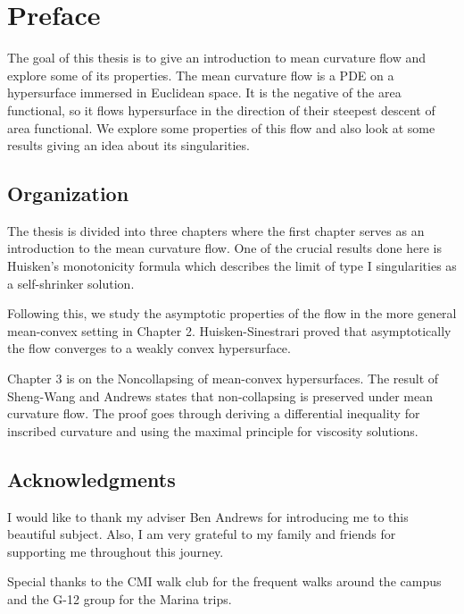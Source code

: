 \chapter{Preface}

The goal of this thesis is to give an introduction to mean curvature flow and explore some of its properties. The mean curvature flow is a PDE on a hypersurface immersed in Euclidean space. It is the negative of the area functional, so it flows hypersurface in the direction of their steepest descent of area functional. We explore some properties of this flow and also look at some results giving an idea about its singularities. 

\section*{Organization}
      
      The thesis is divided into three chapters where the first chapter serves as an introduction to the mean curvature flow. One of the crucial results done here is Huisken's monotonicity formula which describes the limit of type I singularities as a self-shrinker solution.  
      
      Following this, we study the asymptotic properties of the flow in the more general mean-convex setting in Chapter 2. Huisken-Sinestrari proved that asymptotically the flow converges to a weakly convex hypersurface.
      
      Chapter 3 is on the Noncollapsing of mean-convex hypersurfaces. The result of Sheng-Wang and Andrews states that non-collapsing is preserved under mean curvature flow. The proof goes through deriving a differential inequality for inscribed curvature and using the maximal principle for viscosity solutions. 

\section*{Acknowledgments}

I would like to thank my adviser Ben Andrews for introducing me to this beautiful subject. Also, I am very grateful to my family and friends for supporting me throughout this journey.

Special thanks to the CMI walk club for the frequent walks around the campus and the G-12 group for the Marina trips. 